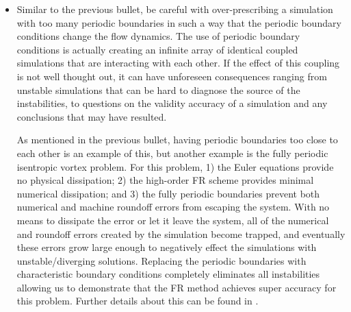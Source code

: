 \begin{itemize}
  \item
    Similar to the previous bullet, be careful with over-prescribing
    a simulation with too many periodic boundaries in such a way that the
    periodic boundary conditions change the flow dynamics.
    The use of periodic boundary conditions is actually creating an infinite
    array of identical coupled simulations that are interacting with each other.
    If the effect of this coupling is not well thought out, it can have
    unforeseen consequences ranging from unstable simulations that can be hard
    to diagnose the source of the instabilities, to questions on the validity
    \andor accuracy of a simulation and any conclusions that may have resulted.
     
    As mentioned in the previous bullet, having periodic boundaries too close to
    each other is an example of this, but another example is the fully periodic
    isentropic vortex problem\cite{Spiegel_2015}.
    For this problem, 
    1) the Euler equations provide no physical dissipation;
    2) the high-order FR scheme provides minimal numerical dissipation; and
    3) the fully periodic boundaries prevent both numerical and machine
       roundoff errors from escaping the system.
    With no means to dissipate the error or let it leave the system, all of the
    numerical and roundoff errors created by the simulation become trapped, and
    eventually these errors grow large enough to negatively effect the
    simulations with unstable\slash diverging solutions.
    Replacing the periodic boundaries with characteristic boundary conditions
    completely eliminates all instabilities allowing us to demonstrate that
    the FR method achieves super accuracy for this problem.
    Further details about this can be found in .
\end{itemize}


\label{SEC:BC:Numerical:Periodic:Inputs}


